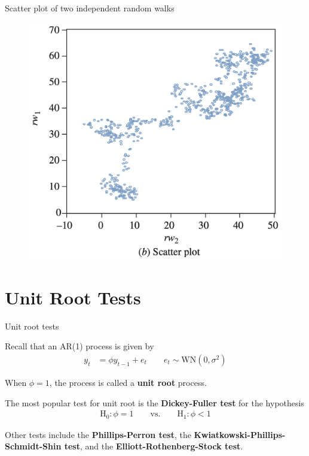 \documentclass[10pt,aspectratio=169]{beamer}  %
\begin{document}

\begin{frame}{Scatter plot of two independent random walks}

    \bigskip
    \begin{figure}[H]
        \centering
        \includegraphics[height=0.5\textwidth]{./fig/rwq-rw2-scatter.png}
    \end{figure}

\end{frame}


\section{Unit Root Tests}


\begin{frame}{Unit root tests}

    \bigskip
    Recall that an AR(1) process is given by
    \begin{align*}
        y_{t} & = \phi y_{t-1} + e_{t} \qquad e_{t} \sim \text{WN} \left( 0, \sigma^{2} \right)
    \end{align*}

    When $ \phi = 1 $, the process is called a \textbf{unit root} process.

    \medskip
    The most popular test for unit root is the \textbf{Dickey-Fuller test} for the hypothesis
    \begin{align*}
        \mathrm{H}_0: \phi = 1 \qquad \text{vs.} \qquad \mathrm{H}_1: \phi < 1
    \end{align*}

    Other tests include the \textbf{Phillips-Perron test}, the \textbf{Kwiatkowski-Phillips-Schmidt-Shin test}, and the \textbf{Elliott-Rothenberg-Stock test}.

\end{frame}
\end{document}
